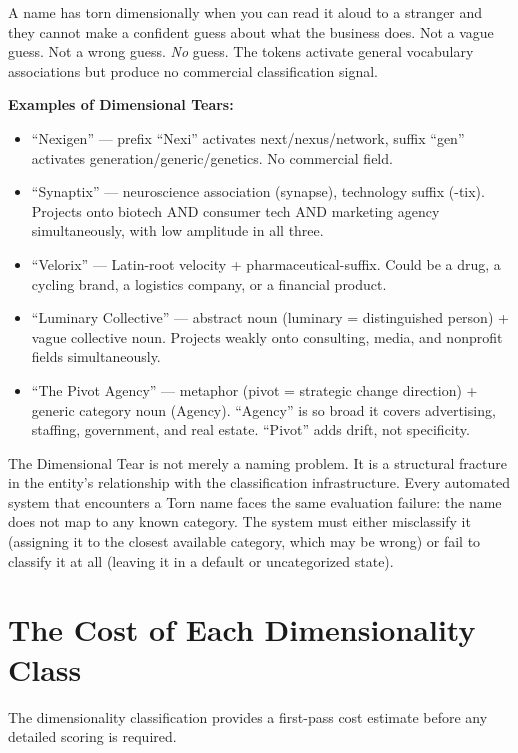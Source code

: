 \documentclass[12pt, openany]{book}
\theoremstyle{thmstyle}
\theoremstyle{defstyle}
\begin{document}
\begin{tearbox}
A name has torn dimensionally when you can read it aloud to a stranger and they cannot make a confident guess about what the business does. Not a vague guess. Not a wrong guess. \textit{No} guess. The tokens activate general vocabulary associations but produce no commercial classification signal.

\textbf{Examples of Dimensional Tears:}
\begin{itemize}[leftmargin=1.5em]
  \item ``Nexigen'' --- prefix ``Nexi'' activates next/nexus/network, suffix ``gen'' activates generation/generic/genetics. No commercial field.
  \item ``Synaptix'' --- neuroscience association (synapse), technology suffix (-tix). Projects onto biotech AND consumer tech AND marketing agency simultaneously, with low amplitude in all three.
  \item ``Velorix'' --- Latin-root velocity + pharmaceutical-suffix. Could be a drug, a cycling brand, a logistics company, or a financial product.
  \item ``Luminary Collective'' --- abstract noun (luminary = distinguished person) + vague collective noun. Projects weakly onto consulting, media, and nonprofit fields simultaneously.
  \item ``The Pivot Agency'' --- metaphor (pivot = strategic change direction) + generic category noun (Agency). ``Agency'' is so broad it covers advertising, staffing, government, and real estate. ``Pivot'' adds drift, not specificity.
\end{itemize}
\end{tearbox}

The Dimensional Tear is not merely a naming problem. It is a structural fracture in the entity's relationship with the classification infrastructure. Every automated system that encounters a Torn name faces the same evaluation failure: the name does not map to any known category. The system must either misclassify it (assigning it to the closest available category, which may be wrong) or fail to classify it at all (leaving it in a default or uncategorized state).

\section{The Cost of Each Dimensionality Class}

The dimensionality classification provides a first-pass cost estimate before any detailed scoring is required.
\end{document}
